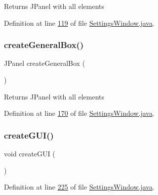\begin{DoxyReturn}{Returns}
J\+Panel with all elements 
\end{DoxyReturn}


Definition at line \hyperlink{_settings_window_8java_source_l00119}{119} of file \hyperlink{_settings_window_8java_source}{Settings\+Window.\+java}.

\hypertarget{classgui_1_1_settings_window_a0e6de45a38ef84cda8e8d6938dd32ad1}{}\label{classgui_1_1_settings_window_a0e6de45a38ef84cda8e8d6938dd32ad1} 
\subsubsection{\texorpdfstring{create\+General\+Box()}{createGeneralBox()}}
{\footnotesize\ttfamily J\+Panel create\+General\+Box (\begin{DoxyParamCaption}{ }\end{DoxyParamCaption})}

\begin{DoxyReturn}{Returns}
J\+Panel with all elements 
\end{DoxyReturn}


Definition at line \hyperlink{_settings_window_8java_source_l00170}{170} of file \hyperlink{_settings_window_8java_source}{Settings\+Window.\+java}.

\hypertarget{classgui_1_1_settings_window_ae3700d532c2ae5e2171016e13584b2d6}{}\label{classgui_1_1_settings_window_ae3700d532c2ae5e2171016e13584b2d6} 
\subsubsection{\texorpdfstring{create\+G\+U\+I()}{createGUI()}}
{\footnotesize\ttfamily void create\+G\+UI (\begin{DoxyParamCaption}{ }\end{DoxyParamCaption})\hspace{0.3cm}{\ttfamily [private]}}



Definition at line \hyperlink{_settings_window_8java_source_l00225}{225} of file \hyperlink{_settings_window_8java_source}{Settings\+Window.\+java}.

